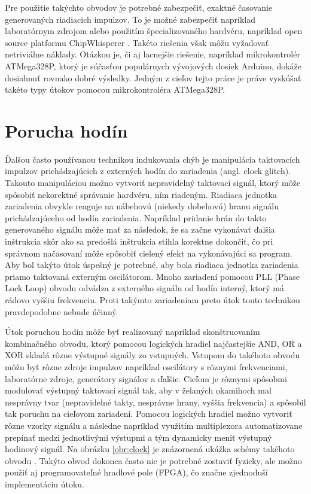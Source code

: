 Pre použitie takýchto obvodov je potrebné zabezpečiť, exaktné časovanie generovaných riadiacich impulzov. To je možné zabezpečiť napríklad laboratórnym zdrojom alebo použitím špecializovaného hardvéru, napríklad open source platformu ChipWhisperer \cite{chipwhisperer}. Takéto riešenia však môžu vyžadovať netriviálne náklady. Otázkou je, či aj lacnejšie riešenie, napríklad mikrokontrolér ATMega328P, ktorý je súčasťou populárnych vývojových dosiek Arduino, dokáže dosiahnuť rovnako dobré výsledky. Jedným z cieľov tejto práce je práve vyskúšať takéto typy útokov pomocou mikrokontroléra ATMega328P.

\section{Porucha hodín}
Ďalšou často používanou technikou indukovania chýb je manipulácia taktovacích impulzov prichádzajúcich z externých hodín do zariadenia (angl. clock glitch). Takouto manipuláciou možno vytvoriť nepravidelný taktovací signál, ktorý môže spôsobiť nekorektné správanie hardvéru, ním riadeným. Riadiaca jednotka zariadenia obvykle reaguje na nábehovú (niekedy dobehovú) hranu signálu prichádzajúceho od hodín zariadenia. Napríklad pridanie hrán do takto generovaného signálu môže mať za následok, že sa začne vykonávať ďalšia inštrukcia skôr ako sa predošlá inštrukcia stihla korektne dokončiť, čo pri správnom načasovaní môže spôsobiť cielený efekt na vykonávajúci sa program. Aby bol takýto útok úspešný je potrebné, aby bola riadiaca jednotka zariadenia priamo taktovaná externým oscilátorom. Mnoho zariadení pomocou PLL (Phase Lock Loop) obvodu odvádza z externého signálu od hodín interný, ktorý má rádovo vyššiu frekvenciu. Proti takýmto zariadeniam preto útok touto technikou pravdepodobne nebude účinný\cite{crowbars}.

Útok poruchou hodín môže byť realizovaný napríklad skonštruovaním kombinačného obvodu, ktorý pomocou logických hradiel najčastejšie AND, OR a XOR skladá rôzne výstupné signály zo vstupných. Vstupom do takéhoto obvodu môžu byť rôzne zdroje impulzov napríklad oscilátory s rôznymi frekvenciami, laboratórne zdroje, generátory signálov a ďalšie. Cieľom je rôznymi spôsobmi modulovať výstupný taktovací signál tak, aby v želaných okamihoch mal nesprávny tvar (nepravidelné takty, nesprávne hrany, vyššia frekvencia) a spôsobil tak poruchu na cieľovom zariadení. Pomocou logických hradiel možno vytvoriť rôzne vzorky signálu a následne napríklad využitím multiplexora automatizovane prepínať medzi jednotlivými výstupmi a tým dynamicky meniť výstupný hodinový signál. Na obrázku \ref{obr:clock} je znázornená ukážka schémy takéhoto obvodu \cite{clockCircuit}. Takýto obvod dokonca často nie je potrebné zostaviť fyzicky, ale možno použiť aj programovateľné hradlové pole (FPGA), čo značne zjednoduší implementáciu útoku.

